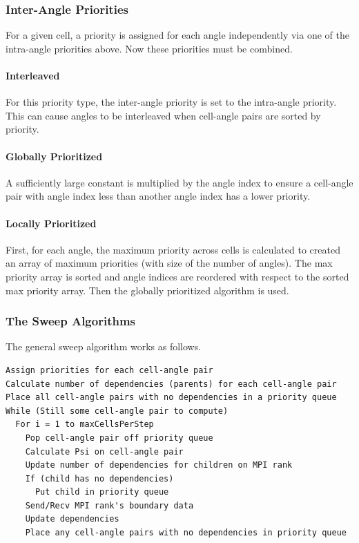 \documentclass[12pt,letterpaper]{article}
\begin{document}
\subsubsection{Inter-Angle Priorities}
For a given cell, a priority is assigned for each angle independently via one of the intra-angle priorities above.
Now these priorities must be combined.

\paragraph{Interleaved}
For this priority type, the inter-angle priority is set to the intra-angle priority.
This can cause angles to be interleaved when cell-angle pairs are sorted by priority.

\paragraph{Globally Prioritized}
A sufficiently large constant is multiplied by the angle index to ensure a cell-angle pair with angle index less than another angle index has a lower priority.

\paragraph{Locally Prioritized}
First, for each angle, the maximum priority across cells is calculated to created an array of maximum priorities (with size of the number of angles).
The max priority array is sorted and angle indices are reordered with respect to the sorted max priority array.
Then the globally prioritized algorithm is used.


\subsubsection{The Sweep Algorithms}

The general sweep algorithm works as follows.
\begin{verbatim}
Assign priorities for each cell-angle pair
Calculate number of dependencies (parents) for each cell-angle pair
Place all cell-angle pairs with no dependencies in a priority queue
While (Still some cell-angle pair to compute)
  For i = 1 to maxCellsPerStep
    Pop cell-angle pair off priority queue
    Calculate Psi on cell-angle pair
    Update number of dependencies for children on MPI rank
    If (child has no dependencies)
      Put child in priority queue
    Send/Recv MPI rank's boundary data
    Update dependencies
    Place any cell-angle pairs with no dependencies in priority queue
\end{verbatim}
\end{document}
